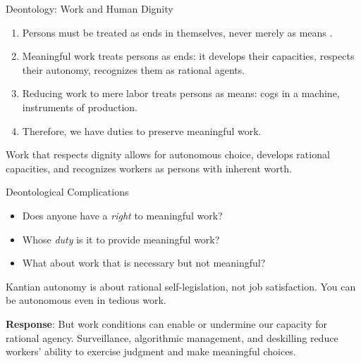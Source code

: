 ﻿\documentclass[aspectratio=169,11pt]{beamer}
\begin{document}
\begin{frame}{Deontology: Work and Human Dignity}
\begin{probox}
\small
\begin{enumerate}
    \item Persons must be treated as ends in themselves, never merely as means \parencite{kant_groundwork}.
    \item Meaningful work treats persons as ends: it develops their capacities, respects their autonomy, recognizes them as rational agents.
    \item Reducing work to mere labor treats persons as means: cogs in a machine, instruments of production.
    \item Therefore, we have duties to preserve meaningful work.
\end{enumerate}
\end{probox}

\vspace{0.2em}
Work that respects dignity allows for autonomous choice, develops rational capacities, and recognizes workers as persons with inherent worth.
\end{frame}

\begin{frame}{Deontological Complications}
\begin{itemize}
    \item Does anyone have a \emph{right} to meaningful work?
    \item Whose \emph{duty} is it to provide meaningful work?
    \item What about work that is necessary but not meaningful?
\end{itemize}

\vspace{0.2em}
\begin{objectionbox}[Objection]
\small
Kantian autonomy is about rational self-legislation, not job satisfaction. You can be autonomous even in tedious work.
\end{objectionbox}

\vspace{0.2em}
\textbf{Response}: But work conditions can enable or undermine our capacity for rational agency. Surveillance, algorithmic management, and deskilling reduce workers' ability to exercise judgment and make meaningful choices.
\end{frame}
\end{document}
